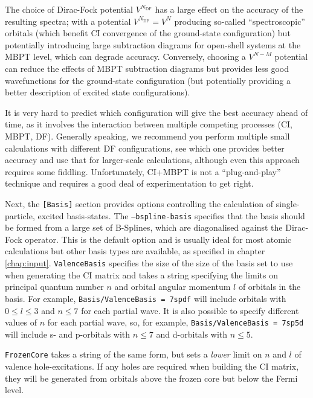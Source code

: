 \documentclass{report}
\begin{document}
The choice of Dirac-Fock potential $V^{N_{\mathrm{DF}}}$ has a large effect on the accuracy of the 
resulting spectra; with a potential $V^{N_{\mathrm{DF}}} = V^{N}$ producing so-called ``spectroscopic'' 
orbitals (which benefit CI convergence of the ground-state configuration) but potentially introducing 
large subtraction diagrams for open-shell systems at the MBPT level, which can degrade accuracy. 
Conversely, choosing a $V^{N-M}$ potential can reduce the effects of MBPT subtraction diagrams but
provides less good wavefunctions for the ground-state configuration (but potentially providing a better
description of excited state configurations). 

It is very hard to predict which configuration will give the best accuracy ahead of time, as it involves
the interaction between multiple competing processes (CI, MBPT, DF). Generally speaking, we recommend 
you perform multiple small calculations with different DF configurations, see which one provides better 
accuracy and use that for larger-scale calculations, although even this approach requires some fiddling.
Unfortunately, CI+MBPT is not a ``plug-and-play'' technique and requires a good deal of experimentation
to get right.

Next, the \texttt{[Basis]} section provides options controlling the calculation of single-particle, 
excited basis-states. The \texttt{--bspline-basis} specifies that the basis should be formed from a 
large set of B-Splines, which are diagonalised against the Dirac-Fock operator. This is the default
option and is usually ideal for most atomic calculations but other basis types are available, as
specified in chapter \ref{chap:input}. \texttt{ValenceBasis} specifies the size of the size of the basis
set to use when generating the CI matrix and takes a string specifying the limits on principal quantum
number $n$ and orbital angular momentum $l$ of orbitals in the basis. For example, 
\texttt{Basis/ValenceBasis = 7spdf} will include orbitals with $0 \leq l \leq 3$ and $n \leq 7$ for
each partial wave. It is also possible to specify different values of $n$ for each partial wave, so, for
example, \texttt{Basis/ValenceBasis = 7sp5d} will include s- and p-orbitals with $n \leq 7$ and
d-orbitals with $n \leq 5$.

\texttt{FrozenCore} takes a string of the same form, but sets a \emph{lower} limit on $n$ and $l$ of
valence hole-excitations. If any holes are required when building the CI matrix, they will be generated
from orbitals above the frozen core but below the Fermi level.
\end{document}
